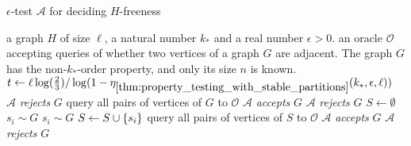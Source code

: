         \begin{algorithm}[H]
            \caption{$\epsilon$-test $\mathcal{A}$ for deciding $H$-freeness}
            \label{alg:h-freeness_tester}
            \begin{algorithmic}[1]
                \Require a graph $H$ of size $\ell$, a natural number $k_*$ and a real number $\epsilon > 0$.
                \Require an oracle $\mathcal{O}$ accepting queries of whether two vertices of a graph $G$ are adjacent.
                    The graph $G$ has the non-$k_*$-order property, and only its size $n$ is known.
                \State $t \leftarrow \ell \log( \frac{2}{3} ) /
                    \log( 1 - \eta_{\ref{thm:property_testing_with_stable_partitions}}(k_*, \epsilon, \ell) )$ 
                 
                    \State $\mathcal{A}$ \emph{rejects} $G$ \label{line:G_smaller_then_H}
                 
                    \State query all pairs of vertices of $G$ to $\mathcal{O}$
                        \State $\mathcal{A}$ \emph{accepts} $G$ \label{line:G_small_enough_found_H}
                    \Else
                        \State $\mathcal{A}$ \emph{rejects} $G$ \label{line:G_small_enough_not_found_H}
                    \EndIf
                \Else \label{line:random_sampling} 
                    \State $S \leftarrow \emptyset$
                        \State $s_{i} \sim G$
                         
                            \State $s_{i} \sim G$
                        \EndWhile
                        \State $S \leftarrow S \cup \{ s_i \}$
                    \EndWhile
                    \State query all pairs of vertices of $S$ to $\mathcal{O}$
                        \State $\mathcal{A}$ \emph{accepts} $G$ \label{line:found_H}
                    \Else
                        \State $\mathcal{A}$ \emph{rejects} $G$ \label{line:not_found_H}
                    \EndIf
                \EndIf
            \end{algorithmic}
        \end{algorithm}

